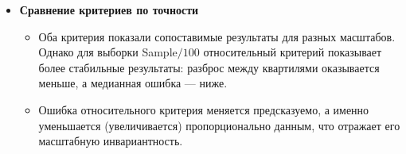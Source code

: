 \newpage

\begin{itemize}
   \item \textbf{Сравнение критериев по точности}
      \begin{itemize}
         \item  Оба критерия показали сопоставимые результаты для разных масштабов. Однако для выборки Sample$/100$ относительный критерий показывает более стабильные результаты: разброс между квартилями оказывается меньше, а медианная ошибка --- ниже. 
         \item Ошибка относительного критерия меняется предсказуемо, а именно уменьшается (увеличивается) пропорционально данным, что отражает его масштабную инвариантность.
      \end{itemize}
      \end{itemize}

\newpage



